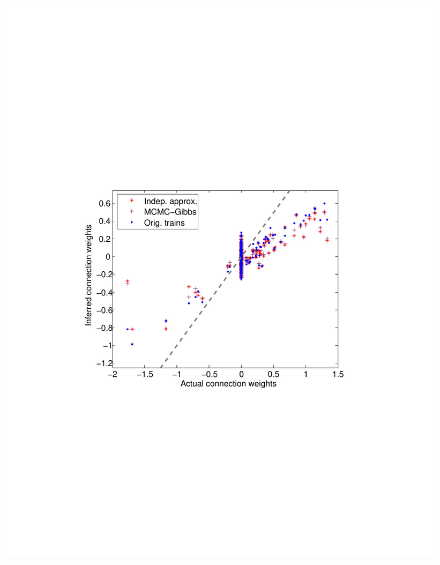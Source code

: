 \begin{figure}[h]
\centering
\begin{minipage}[c]{0.45\hsize}
\includegraphics[width=\hsize]{../figs/FigureA3_scatter_three}
\end{minipage}
\begin{minipage}[c]{0.45\hsize}

\end{minipage}
\end{figure}
